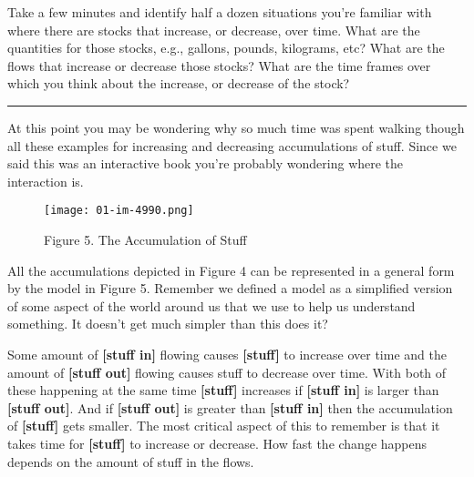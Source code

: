 \documentclass[]{memoir}
\makeatletter
\def\maxwidth{\ifdim\Gin@nat@width>\linewidth\linewidth
\else\Gin@nat@width\fi}
\let\Oldincludegraphics\includegraphics
\renewcommand{\includegraphics}[1]{\Oldincludegraphics[width=\maxwidth]{#1}}
\newcommand{\p}[1]{\textbf{{[}#1{]}}}
\makeatother
\begin{document}
Take a few minutes and identify half a dozen situations you're familiar
with where there are stocks that increase, or decrease, over time. What
are the quantities for those stocks, e.g., gallons, pounds, kilograms,
etc? What are the flows that increase or decrease those stocks? What are
the time frames over which you think about the increase, or decrease of
the stock?

\begin{center}\rule{3in}{0.4pt}\end{center}

At this point you may be wondering why so much time was spent walking
though all these examples for increasing and decreasing accumulations of
stuff. Since we said this was an interactive book you're probably
wondering where the interaction is.

\begin{figure}[htbp]
\centering
\texttt{[image: 01-im-4990.png]}
\caption{Figure 5. The Accumulation of Stuff}
\end{figure}

All the accumulations depicted in Figure 4 can be represented in a
general form by the model in Figure 5. Remember we defined a model as a
simplified version of some aspect of the world around us that we use to
help us understand something. It doesn't get much simpler than this does
it?

Some amount of \p{stuff in} flowing causes \p{stuff} to increase over
time and the amount of \p{stuff out} flowing causes stuff to decrease
over time. With both of these happening at the same time \p{stuff}
increases if \p{stuff in} is larger than \p{stuff out}. And if
\p{stuff out} is greater than \p{stuff in} then the accumulation of
\p{stuff} gets smaller. The most critical aspect of this to remember is
that it takes time for \p{stuff} to increase or decrease. How fast the
change happens depends on the amount of stuff in the flows.

\FloatBarrier 
\end{document}
